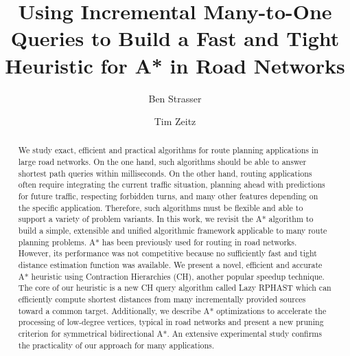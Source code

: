 \documentclass[manuscript,review]{acmart}
\begin{document}
\title{Using Incremental Many-to-One Queries to Build a Fast and Tight Heuristic for A* in Road Networks}

\author{Ben Strasser}

\author{Tim Zeitz}


\renewcommand{\shortauthors}{B. Strasser and T. Zeitz}


\begin{abstract}
We study exact, efficient and practical algorithms for route planning applications in large road networks.
On the one hand, such algorithms should be able to answer shortest path queries within milliseconds.
On the other hand, routing applications often require integrating the current traffic situation, planning ahead with predictions for future traffic, respecting forbidden turns, and many other features depending on the specific application.
Therefore, such algorithms must be flexible and able to support a variety of problem variants.
In this work, we revisit the A* algorithm to build a simple, extensible and unified algorithmic framework applicable to many route planning problems. %
A* has been previously used for routing in road networks.
However, its performance was not competitive because no sufficiently fast and tight distance estimation function was available.
We present a novel, efficient and accurate A* heuristic using Contraction Hierarchies (CH), another popular speedup technique.
The core of our heuristic is a new CH query algorithm called Lazy RPHAST which can efficiently compute shortest distances from many incrementally provided sources toward a common target.
Additionally, we describe A* optimizations to accelerate the processing of low-degree vertices, typical in road networks and present a new pruning criterion for symmetrical bidirectional A*.
An extensive experimental study confirms the practicality of our approach for many applications.
\end{abstract}
\end{document}
